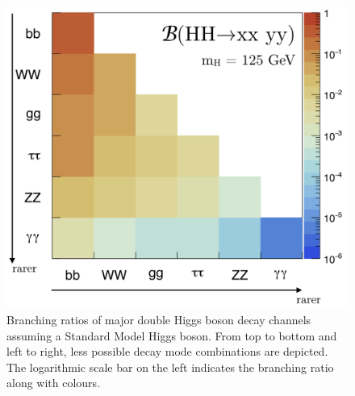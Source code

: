 \begin{figure}[ht]
	\centering
	\includegraphics[scale=0.4]{MSc_Thesis/fig/HHdecaymodes.png}
	\vspace{2mm}
	\caption[Branching ratio of major double Higgs boson decay channels assuming a Standard Model Higgs boson. From top to bottom and left to right, less possible decay mode combinations are depicted. The logarithmic scale bar on the left indicates the branching ratio along with colours.]
	{Branching ratios of major double Higgs boson decay channels assuming a Standard Model Higgs boson\cite{Gouzevitch2020}. From top to bottom and left to right, less possible decay mode combinations are depicted. The logarithmic scale bar on the left indicates the branching ratio along with colours.}
	\label{HHdecaymodes}
\end{figure}

